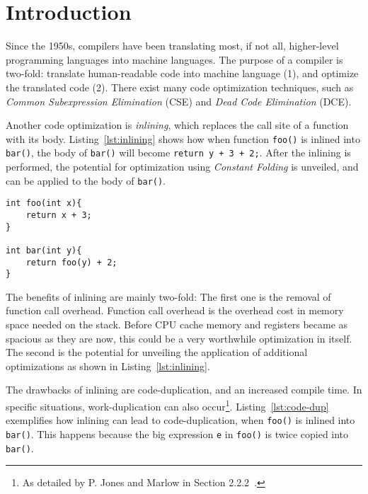 
\section{Introduction}
\label{introduction}

Since the 1950s, compilers have been translating most, if not all, higher-level
programming languages into machine languages. The purpose of a compiler is
two-fold: translate human-readable code into machine language (1), and optimize
the translated code (2). There exist many code optimization techniques, such as
\textit{Common Subexpression Elimination} (CSE) and \textit{Dead Code
Elimination} (DCE).

Another code optimization is \textit{inlining}, which replaces the call site of
a function with its body. Listing~\ref{lst:inlining} shows how when function
\lstinline!foo()! is inlined into \lstinline!bar()!, the body of
\lstinline!bar()! will become \lstinline!return y + 3 + 2;!. After the inlining
is performed, the potential for optimization using \textit{Constant Folding} is
unveiled, and can be applied to the body of \lstinline!bar()!.

\begin{lstlisting}[label={lst:inlining}, style=global_customcpp,
caption={Function \lstinline!foo()! inlined into function \lstinline!bar()!.}]
int foo(int x){
	return x + 3;
}

int bar(int y){
	return foo(y) + 2;
}
\end{lstlisting}
\vspace{-3\parskip} %

The benefits of inlining are mainly two-fold: The first one is the removal of
function call overhead. Function call overhead is the overhead cost in memory
space needed on the stack. Before CPU cache memory and registers became as
spacious as they are now, this could be a very worthwhile optimization in
itself. The second is the potential for unveiling the application of additional
optimizations as shown in Listing~\ref{lst:inlining}.

The drawbacks of inlining are code-duplication, and an increased compile time.
In specific situations, work-duplication can also occur\footnote{As detailed by
P. Jones and Marlow in Section 2.2.2~\cite{GHCPaper}.}. Listing~\ref{lst:code-dup}
exemplifies how inlining can lead to code-duplication, when
\lstinline!foo()! is inlined into \lstinline!bar()!. This happens because the
big expression \lstinline!e! in \lstinline!foo()! is twice copied into
\lstinline!bar()!.

